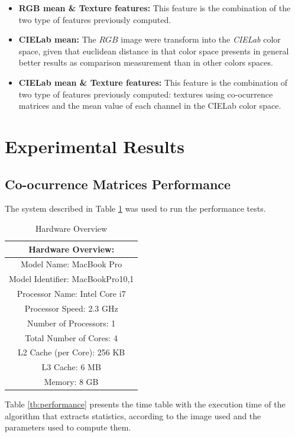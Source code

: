 \documentclass{IEEEtran}
\begin{document}
\begin{itemize}
 \item \textbf{RGB mean \& Texture features:} This feature is the combination of the two type of features previously computed. 
 \item \textbf{CIELab mean:} The $RGB$ image were transform into the \textit{CIELab} color space, given that euclidean distance in that color space presents in general better results as comparison measurement than in other colors spaces. 
 \item \textbf{CIELab mean \& Texture features:} This feature is the combination of two type of features previously computed: textures using co-ocurrence matrices and the mean value of each channel in the CIELab color space.
\end{itemize}

\section{Experimental Results}

\subsection{Co-ocurrence Matrices Performance}

The system described in Table \ref{tb:hwoverview} was used to run the performance tests.\\

\begin{table}[h!] 
\centering
\begin{tabular}{|c|}
\hline
Hardware Overview:\\
\hline
  Model Name:   MacBook Pro\\
  Model Identifier: MacBookPro10,1\\
  Processor Name:   Intel Core i7\\
  Processor Speed:  2.3 GHz\\
  Number of Processors: 1\\ 
  Total Number of Cores:    4\\ 
  L2 Cache (per Core):  256 KB\\
  L3 Cache: 6 MB\\
  Memory:   8 GB\\
\hline
\end{tabular}
\caption{Hardware Overview}
\label{tb:hwoverview}
\end{table}

Table \ref{tb:performance} presents the time table with the execution time of the
algorithm that extracts statistics, according to the image used and the parameters used to compute them.
\end{document}
